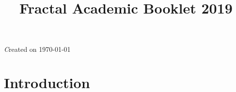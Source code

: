 \documentclass[10pt, a4paper]{book}
\title{Fractal Academic Booklet 2019}
\author{}
\date{}
\newcommand{\chaptertitle}[1]{
    \stepcounter{chapter}
    \chapter*{\thechapter\hspace{3mm}#1}\addcontentsline{toc}{chapter}{\thechapter\hspace{3mm}#1}
}
\begin{document}


\begingroup
\let\cleardoublepage\clearpage
\tableofcontents
\endgroup
\vspace {3mm}
{\color{Crimson} {\emph Created on \today\par}}
\chapter{Introduction}


\newpage
\end{document}
